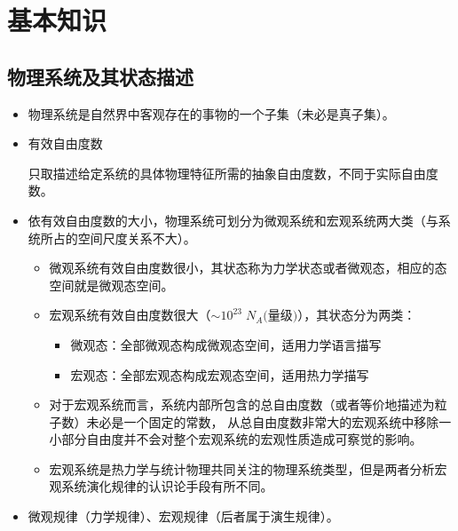 \chapter{基本知识}
\section{物理系统及其状态描述}
\begin{defn}
    \noindent
    \begin{itemize}
        \item 物理系统是自然界中客观存在的事物的一个子集（未必是真子集）。
        \item 有效自由度数
        
        只取描述给定系统的具体物理特征所需的抽象自由度数，不同于实际自由度数。
        \item 依有效自由度数的大小，物理系统可划分为微观系统和宏观系统两大类（与系统所占的空间尺度关系不大）。
    \begin{itemize}
        \item 微观系统有效自由度数很小，其状态称为力学状态或者微观态，相应的态空间就是微观态空间。
        \item 宏观系统有效自由度数很大（\(\sim 10^{23}\;N_A\text{(量级)}\)），其状态分为两类：
        \begin{itemize}
            \item 微观态：全部微观态构成微观态空间，适用力学语言描写
            \item 宏观态：全部宏观态构成宏观态空间，适用热力学描写
        \end{itemize}
        \item 对于宏观系统而言，系统内部所包含的总自由度数（或者等价地描述为粒子数）未必是一个固定的常数，
        从总自由度数非常大的宏观系统中移除一小部分自由度并不会对整个宏观系统的宏观性质造成可察觉的影响。
        \item 宏观系统是热力学与统计物理共同关注的物理系统类型，但是两者分析宏观系统演化规律的认识论手段有所不同。
    \end{itemize}
        \item 微观规律（力学规律）、宏观规律（后者属于演生规律）。
    \end{itemize}
\end{defn}
